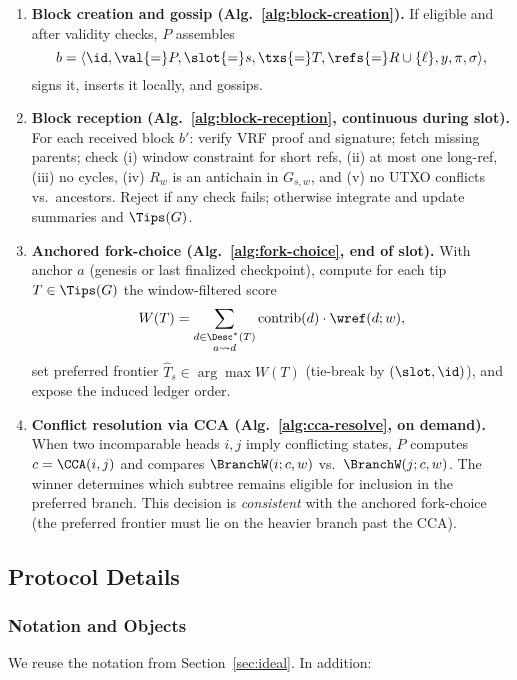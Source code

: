 {\begin{enumerate}
  \item \textbf{Block creation and gossip (Alg.~\ref{alg:block-creation}).}
  If eligible and after validity checks, $P$ assembles
  \[
  b=\langle 
  \id,\val{=}P,\slot{=}s,\txs{=}T,\refs{=}R\cup\{\ell\},y,\pi,\sigma\rangle,
  \]
  signs it, inserts it locally, and gossips.

  \item \textbf{Block reception (Alg.~\ref{alg:block-reception}, continuous during slot).}
  For each received block $b'$: verify VRF proof and signature; fetch missing parents; check (i) window constraint for short refs, (ii) at most one long-ref, (iii) no cycles, (iv) $R_w$ is an antichain in $G_{s,w}$, and (v) no UTXO conflicts vs.\ ancestors. Reject if any check fails; otherwise integrate and update summaries and $\Tips(G)$.

  \item \textbf{Anchored fork-choice (Alg.~\ref{alg:fork-choice}, end of slot).}
  With anchor $a$ (genesis or last finalized checkpoint), compute for each tip $T\in\Tips(G)$ the window-filtered score
  \[
  W(T)=\sum_{\substack{d\in\Desc^*(T)\\a\leadsto d}}\mathrm{contrib}(d)\cdot 
  \wref(d;w),
  \]
  set preferred frontier $\hat T_s\in\arg\max W(T)$ (tie-break by $(\slot,\id)$), and expose the induced ledger order.

  \item \textbf{Conflict resolution via CCA (Alg.~\ref{alg:cca-resolve}, on demand).}
  When two incomparable heads $i,j$ imply conflicting states, $P$ computes $c=\CCA(i,j)$ and compares $\BranchW(i;c,w)$ vs.\ $\BranchW(j;c,w)$. The winner determines which subtree remains eligible for inclusion in the preferred branch. This decision is \emph{consistent} with the anchored fork-choice (the preferred frontier must lie on the heavier branch past the CCA).
\end{enumerate}


}%





\subsection{Protocol Details}
\label{subsec:base-details}

\subsubsection{Notation and Objects}
\label{subsec:notation}
We reuse the notation from Section~\ref{sec:ideal}. In addition:

